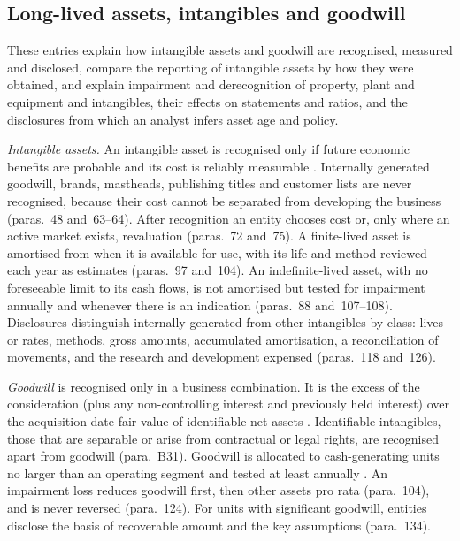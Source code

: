 \subsection{Long-lived assets, intangibles and goodwill}

These entries explain how intangible assets and goodwill are recognised, measured and disclosed, compare the reporting of intangible assets by how they were obtained, and explain impairment and derecognition of property, plant and equipment and intangibles, their effects on statements and ratios, and the disclosures from which an analyst infers asset age and policy.

\begin{qfmethod}\label{meth:intangibles-goodwill-reporting}
 \emph{Intangible assets.} An intangible asset is recognised only if future economic benefits are probable and its cost is reliably measurable \citep[IAS~38 para.~21]{eu-2023-1803-ias38}. Internally generated goodwill, brands, mastheads, publishing titles and customer lists are never recognised, because their cost cannot be separated from developing the business (paras.~48 and~63--64). After recognition an entity chooses cost or, only where an active market exists, revaluation (paras.~72 and~75). A finite-lived asset is amortised from when it is available for use, with its life and method reviewed each year as estimates (paras.~97 and~104). An indefinite-lived asset, with no foreseeable limit to its cash flows, is not amortised but tested for impairment annually and whenever there is an indication (paras.~88 and~107--108). Disclosures distinguish internally generated from other intangibles by class: lives or rates, methods, gross amounts, accumulated amortisation, a reconciliation of movements, and the research and development expensed (paras.~118 and~126).

\emph{Goodwill} is recognised only in a business combination. It is the excess of the consideration (plus any non-controlling interest and previously held interest) over the acquisition-date fair value of identifiable net assets \citep[IFRS~3 para.~32]{eu-2023-1803-ifrs3}. Identifiable intangibles, those that are separable or arise from contractual or legal rights, are recognised apart from goodwill (para.~B31). Goodwill is allocated to cash-generating units no larger than an operating segment and tested at least annually \citep[IAS~36 paras.~10 and~80]{eu-2023-1803-ias36}. An impairment loss reduces goodwill first, then other assets pro rata (para.~104), and is never reversed (para.~124). For units with significant goodwill, entities disclose the basis of recoverable amount and the key assumptions (para.~134).


\end{qfmethod}
